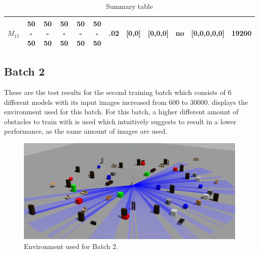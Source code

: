 \begin{table}[H]
{\begin{tabular}{|c|c|c|c|c|c|c|c|c|c|c|c|}
\rowcolor[HTML]{FFFFFF} 
$M_{15}$                                                                             & 50 - 50                                 & 50 - 50                                 & 50 - 50                                 & 50 - 50                                 & 50 - 50                                 & .02                                                                                     & {[}0,0{]}                                                                                   & {[}0,0,0{]}                                                                                 & no                                                                                        & {[}0,0,0,0,0{]}                                                                         & 19200                                                                                     \\ \hline
\end{tabular}
}
\caption{Summary table}
\label{tab:summary_table_1}
\end{table}


\newpage

\subsection{Batch 2 \label{batch_2} }
These are the test results for the second training batch which consists of 6 different models with its input images increased from 600 to 30000.  displays the environment used for this batch. For this batch, a higher different amount of obstacles to train with is used which intuitively suggests to result in a lower performance, as the same amount of images are used.

\begin{figure}[H]%
\centering
\includegraphics[width=1\textwidth]{Bilder/env1_env2_env3.png} 
\caption[]{Environment used for Batch 2.}
\label{env_1_3}
\end{figure}

